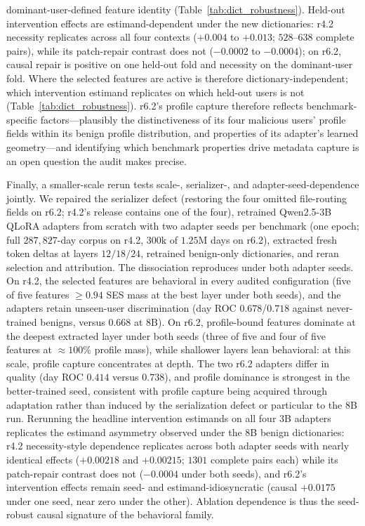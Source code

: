\documentclass[10pt]{article} %
\newcommand{\rsix}{r6.2}
\newcommand{\rfour}{r4.2}
\begin{document}
dominant-user-defined feature identity
(Table~\ref{tab:dict_robustness}). Held-out intervention effects are
estimand-dependent under the new dictionaries: \rfour{} necessity replicates
across all four contexts ($+0.004$ to $+0.013$; $528$--$638$ complete pairs),
while its patch-repair contrast does not ($-0.0002$ to $-0.0004$); on
\rsix{}, causal repair is positive on one held-out fold and necessity on the
dominant-user fold. Where the selected features are active is therefore
dictionary-independent; which intervention estimand replicates on which
held-out users is not (Table~\ref{tab:dict_robustness}). \rsix{}'s
profile capture therefore reflects benchmark-specific factors---plausibly the
distinctiveness of its four malicious users' profile fields within its benign
profile distribution, and properties of its adapter's learned geometry---and
identifying which benchmark properties drive metadata capture is an open
question the audit makes precise.



Finally, a smaller-scale rerun tests scale-, serializer-, and
adapter-seed-dependence jointly. We repaired the serializer defect
(restoring the four omitted file-routing fields on \rsix{}; \rfour{}'s
release contains one of the four), retrained Qwen2.5-3B QLoRA adapters from
scratch with two adapter seeds per benchmark (one epoch; full $287{,}827$-day
corpus on \rfour{}, $300$k of $1.25$M days on \rsix{}), extracted fresh
token deltas at layers $12/18/24$, retrained benign-only dictionaries, and
reran selection and attribution. The dissociation reproduces under both
adapter seeds. On \rfour{}, the selected features are behavioral in every
audited configuration (five of five features $\geq 0.94$ SES mass at the
best layer under both seeds), and the adapters retain unseen-user
discrimination (day ROC $0.678$/$0.718$ against never-trained benigns,
versus $0.668$ at 8B). On \rsix{}, profile-bound features dominate at the
deepest extracted layer under both seeds (three of five and four of five
features at $\approx 100\%$ profile mass), while shallower layers lean
behavioral: at this scale, profile capture concentrates at depth. The two
\rsix{} adapters differ in quality (day ROC $0.414$ versus $0.738$), and
profile dominance is strongest in the better-trained seed, consistent with
profile capture being acquired through adaptation rather than induced by
the serialization defect or particular to the 8B run. Rerunning the
headline intervention estimands on all four 3B adapters replicates the
estimand asymmetry observed under the 8B benign dictionaries: \rfour{}
necessity-style dependence replicates across both adapter seeds with nearly
identical effects ($+0.00218$ and $+0.00215$; $1301$ complete pairs each)
while its patch-repair contrast does not ($-0.0004$ under both seeds), and
\rsix{}'s intervention effects remain seed- and estimand-idiosyncratic
(causal $+0.0175$ under one seed, near zero under the other). Ablation
dependence is thus the seed-robust causal signature of the behavioral
family.
\end{document}
